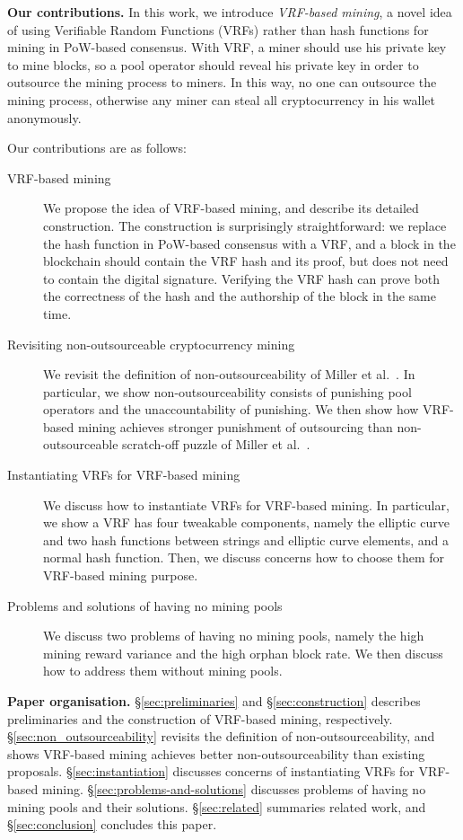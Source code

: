 \textbf{Our contributions.}
In this work, we introduce \textit{VRF-based mining}, a novel idea of using Verifiable Random Functions (VRFs) rather than hash functions for mining in PoW-based consensus.
With VRF, a miner should use his private key to mine blocks, so a pool operator should reveal his private key in order to outsource the mining process to miners.
In this way, no one can outsource the mining process, otherwise any miner can steal all cryptocurrency in his wallet anonymously.

Our contributions are as follows:

\begin{description}
    \item [VRF-based mining] We propose the idea of VRF-based mining, and describe its detailed construction. The construction is surprisingly straightforward: we replace the hash function in PoW-based consensus with a VRF, and a block in the blockchain should contain the VRF hash and its proof, but does not need to contain the digital signature. Verifying the VRF hash can prove both the correctness of the hash and the authorship of the block in the same time.
    \item [Revisiting non-outsourceable cryptocurrency mining] We revisit the definition of non-outsourceability of Miller et al.~\cite{miller2015nonoutsourceable}. In particular, we show non-outsourceability consists of punishing pool operators and the unaccountability of punishing. We then show how VRF-based mining achieves stronger punishment of outsourcing than non-outsourceable scratch-off puzzle of Miller et al.~\cite{miller2015nonoutsourceable}.
    \item [Instantiating VRFs for VRF-based mining] We discuss how to instantiate VRFs for VRF-based mining. In particular, we show a VRF has four tweakable components, namely the elliptic curve and two hash functions between strings and elliptic curve elements, and a normal hash function. Then, we discuss concerns how to choose them for VRF-based mining purpose.
    \item [Problems and solutions of having no mining pools] We discuss two problems of having no mining pools, namely the high mining reward variance and the high orphan block rate. We then discuss how to address them without mining pools.
\end{description}

\textbf{Paper organisation.}
\S\ref{sec:preliminaries} and \S\ref{sec:construction} describes preliminaries and the construction of VRF-based mining, respectively.
\S\ref{sec:non_outsourceability} revisits the definition of non-outsourceability, and shows VRF-based mining achieves better non-outsourceability than existing proposals.
\S\ref{sec:instantiation} discusses concerns of instantiating VRFs for VRF-based mining.
\S\ref{sec:problems-and-solutions} discusses problems of having no mining pools and their solutions.
\S\ref{sec:related} summaries related work, and \S\ref{sec:conclusion} concludes this paper.
